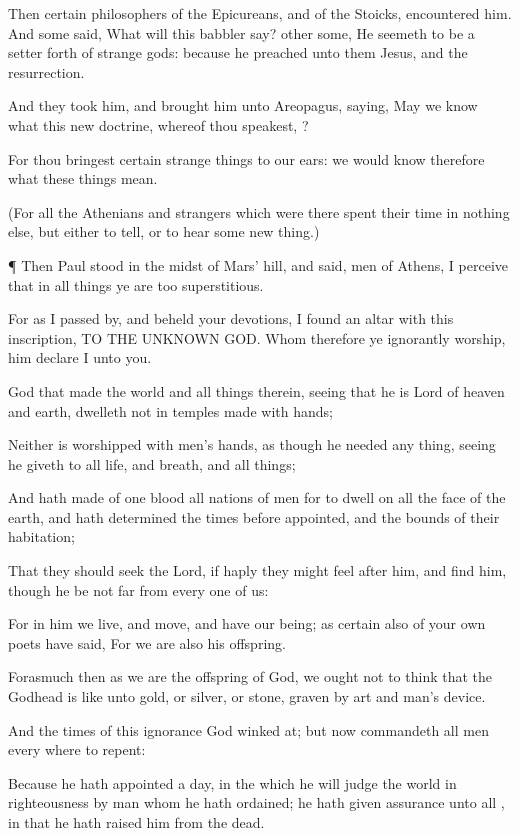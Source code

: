 {Then
certain
philosophers of the
Epicureans,
and of the
Stoicks,
encountered
him.
And
some
said,
What
will
this
babbler
say? other
some, He
seemeth to
be a setter
forth of
strange
gods:
because he
preached unto
them
Jesus,
and the
resurrection.

And they
took
him, and brought
him
unto
Areopagus,
saying,
May we
know
what
this
new
doctrine,
whereof
thou
speakest,
{}?

For thou
bringest
certain
strange things
to
our
ears: we
would
know
therefore
what these
things
mean.

(For
all the
Athenians
and
strangers
which were
there spent their
time
in
nothing
else, but
either to
tell,
or to
hear
some new
thing.)


\par }{\PP {}¶
Then
Paul
stood
in the
midst of
Mars’
hill, and
said,
{}
men of
Athens, I
perceive that
in all
things
ye
are too
superstitious.

For as I passed
by,
and
beheld
your
devotions, I
found an
altar
with
this
inscription, TO THE
UNKNOWN
GOD.
Whom
therefore ye
ignorantly
worship,
him
declare
I unto
you.

God that
made the
world
and all
things
therein, seeing that
he
is
Lord of
heaven
and
earth,
dwelleth
not
in
temples made with
hands;

Neither is
worshipped
with
men’s
hands, as though he
needed any
thing, seeing
he
giveth to
all
life,
and
breath,
and all
things;

And hath
made
of
one
blood
all
nations of
men for to
dwell
on
all the
face of the
earth, and hath
determined the
times before
appointed,
and the
bounds of
their
habitation;

That they should
seek the
Lord,
if
haply they might feel
after
him,
and
find
him,
though he
be
not
far
from
every
one of
us:

For
in
him we
live,
and
move,
and have our
being;
as
certain
also
of your
own
poets have
said,
For we
are
also his
offspring.

Forasmuch
then as we
are the
offspring of
God, we
ought
not to think
that the
Godhead
is like
unto
gold,
or
silver,
or
stone,
graven by
art
and
man’s
device.

And the
times of this
ignorance
God winked
at;
but
now
commandeth
all
men every
where to
repent:

Because he hath
appointed a
day,
in the
which he
will
judge the
world
in
righteousness
by
{}
man
whom he hath
ordained;
{} he hath
given
assurance unto
all
{}, in that he hath
raised
him
from the
dead.


}
